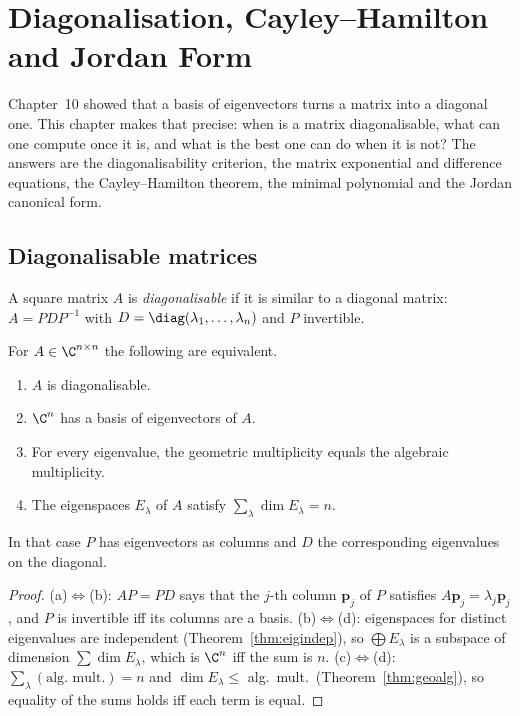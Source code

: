 \chapter{Diagonalisation, Cayley--Hamilton and Jordan Form}

Chapter~10 showed that a basis of eigenvectors turns a matrix into a diagonal one. This chapter makes that precise: when is a matrix diagonalisable, what can one compute once it is, and what is the best one can do when it is not? The answers are the diagonalisability criterion, the matrix exponential and difference equations, the Cayley--Hamilton theorem, the minimal polynomial and the Jordan canonical form.

\section{Diagonalisable matrices}

\begin{definition}[Diagonalisable]
A square matrix $A$ is \emph{diagonalisable} if it is similar to a diagonal matrix: $A=PDP^{-1}$ with $D=\diag(\lambda_1,\dots,\lambda_n)$ and $P$ invertible.
\end{definition}

\begin{theorem}\label{thm:diagcrit}
For $A\in\C^{n\times n}$ the following are equivalent.
\begin{enumerate}[label=(\alph*)]
  \item $A$ is diagonalisable.
  \item $\C^n$ has a basis of eigenvectors of $A$.
  \item For every eigenvalue, the geometric multiplicity equals the algebraic multiplicity.
  \item The eigenspaces $E_{\lambda}$ of $A$ satisfy $\sum_\lambda\dim E_\lambda=n$.
\end{enumerate}
In that case $P$ has eigenvectors as columns and $D$ the corresponding eigenvalues on the diagonal.
\end{theorem}

\begin{proof}
(a)$\Leftrightarrow$(b): $AP=PD$ says that the $j$-th column $\mathbf{p}_j$ of $P$ satisfies $A\mathbf{p}_j=\lambda_j\mathbf{p}_j$, and $P$ is invertible iff its columns are a basis. (b)$\Leftrightarrow$(d): eigenspaces for distinct eigenvalues are independent (Theorem~\ref{thm:eigindep}), so $\bigoplus E_\lambda$ is a subspace of dimension $\sum\dim E_\lambda$, which is $\C^n$ iff the sum is $n$. (c)$\Leftrightarrow$(d): $\sum_\lambda(\text{alg.\ mult.})=n$ and $\dim E_\lambda\le$ alg.\ mult.\ (Theorem~\ref{thm:geoalg}), so equality of the sums holds iff each term is equal.
\end{proof}

